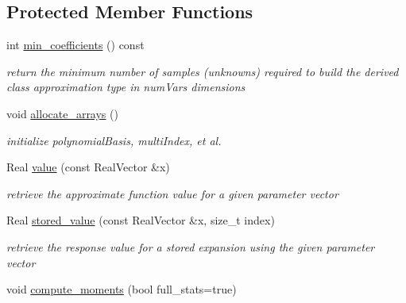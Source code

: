 \subsection*{Protected Member Functions}
\begin{DoxyCompactItemize}
\item 
int \hyperlink{classPecos_1_1ProjectOrthogPolyApproximation_ac789358ee49633613d6c97593be06f9d}{min\+\_\+coefficients} () const \label{classPecos_1_1ProjectOrthogPolyApproximation_ac789358ee49633613d6c97593be06f9d}

\begin{DoxyCompactList}\small\item\em return the minimum number of samples (unknowns) required to build the derived class approximation type in num\+Vars dimensions \end{DoxyCompactList}\item 
void \hyperlink{classPecos_1_1ProjectOrthogPolyApproximation_a37ef37829b412fefa40d53b395846781}{allocate\+\_\+arrays} ()\label{classPecos_1_1ProjectOrthogPolyApproximation_a37ef37829b412fefa40d53b395846781}

\begin{DoxyCompactList}\small\item\em initialize polynomial\+Basis, multi\+Index, et al. \end{DoxyCompactList}\item 
Real \hyperlink{classPecos_1_1ProjectOrthogPolyApproximation_a7bc9dcdf32fc46f97e286268c1ac51b0}{value} (const Real\+Vector \&x)\label{classPecos_1_1ProjectOrthogPolyApproximation_a7bc9dcdf32fc46f97e286268c1ac51b0}

\begin{DoxyCompactList}\small\item\em retrieve the approximate function value for a given parameter vector \end{DoxyCompactList}\item 
Real \hyperlink{classPecos_1_1ProjectOrthogPolyApproximation_a1abe918dbdc66ac0fde85f1ab3c061af}{stored\+\_\+value} (const Real\+Vector \&x, size\+\_\+t index)\label{classPecos_1_1ProjectOrthogPolyApproximation_a1abe918dbdc66ac0fde85f1ab3c061af}

\begin{DoxyCompactList}\small\item\em retrieve the response value for a stored expansion using the given parameter vector \end{DoxyCompactList}\item 
void \hyperlink{classPecos_1_1ProjectOrthogPolyApproximation_a5926c67431b0fc223fcfa6c11cb9de14}{compute\+\_\+moments} (bool full\+\_\+stats=true)\label{classPecos_1_1ProjectOrthogPolyApproximation_a5926c67431b0fc223fcfa6c11cb9de14}


\end{DoxyCompactItemize}
